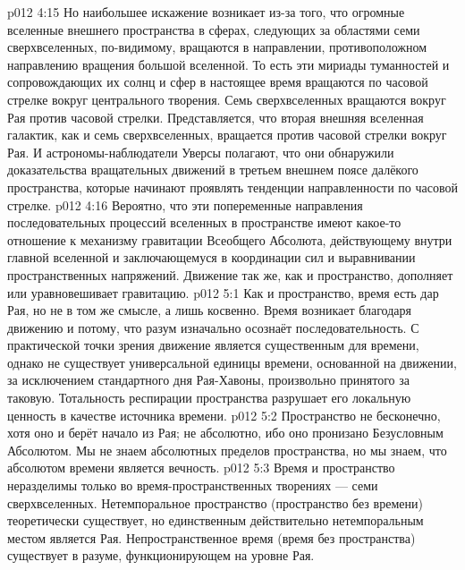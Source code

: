 \vs p012 4:15 Но наибольшее искажение возникает из\hyp{}за того, что огромные вселенные внешнего пространства в сферах, следующих за областями семи сверхвселенных, по\hyp{}видимому, вращаются в направлении, противоположном направлению вращения большой вселенной. То есть эти мириады туманностей и сопровождающих их солнц и сфер в настоящее время вращаются по часовой стрелке вокруг центрального творения. Семь сверхвселенных вращаются вокруг Рая против часовой стрелки. Представляется, что вторая внешняя вселенная галактик, как и семь сверхвселенных, вращается против часовой стрелки вокруг Рая. И астрономы\hyp{}наблюдатели Уверсы полагают, что они обнаружили доказательства вращательных движений в третьем внешнем поясе далёкого пространства, которые начинают проявлять тенденции направленности по часовой стрелке.
\vs p012 4:16 Вероятно, что эти попеременные направления последовательных процессий вселенных в пространстве имеют какое\hyp{}то отношение к механизму гравитации Всеобщего Абсолюта, действующему внутри главной вселенной и заключающемуся в координации сил и выравнивании пространственных напряжений. Движение так же, как и пространство, дополняет или уравновешивает гравитацию.
\vs p012 5:1 Как и пространство, время есть дар Рая, но не в том же смысле, а лишь косвенно. Время возникает благодаря движению и потому, что разум изначально осознаёт последовательность. С практической точки зрения движение является существенным для времени, однако не существует универсальной единицы времени, основанной на движении, за исключением стандартного дня Рая\hyp{}Хавоны, произвольно принятого за таковую. Тотальность респирации пространства разрушает его локальную ценность в качестве источника времени.
\vs p012 5:2 Пространство не бесконечно, хотя оно и берёт начало из Рая; не абсолютно, ибо оно пронизано Безусловным Абсолютом. Мы не знаем абсолютных пределов пространства, но мы знаем, что абсолютом времени является вечность.
\vs p012 5:3 \pc Время и пространство неразделимы только во время\hyp{}пространственных творениях --- семи сверхвселенных. Нетемпоральное пространство (пространство без времени) теоретически существует, но единственным действительно нетемпоральным местом является  Рая. Непространственное время (время без пространства) существует в разуме, функционирующем на уровне Рая.
